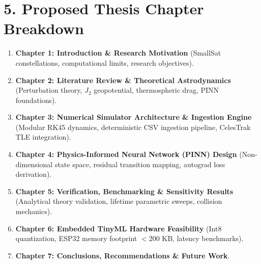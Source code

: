 \documentclass[11pt,a4paper]{article}
\begin{document}
\section*{5. Proposed Thesis Chapter Breakdown}
\begin{enumerate}[leftmargin=*,itemsep=1pt]
    \item \textbf{Chapter 1: Introduction \& Research Motivation} (SmallSat constellations, computational limits, research objectives).
    \item \textbf{Chapter 2: Literature Review \& Theoretical Astrodynamics} (Perturbation theory, $J_2$ geopotential, thermospheric drag, PINN foundations).
    \item \textbf{Chapter 3: Numerical Simulator Architecture \& Ingestion Engine} (Modular RK45 dynamics, deterministic CSV ingestion pipeline, CelesTrak TLE integration).
    \item \textbf{Chapter 4: Physics-Informed Neural Network (PINN) Design} (Non-dimensional state space, residual transition mapping, autograd loss derivation).
    \item \textbf{Chapter 5: Verification, Benchmarking \& Sensitivity Results} (Analytical theory validation, lifetime parametric sweeps, collision mechanics).
    \item \textbf{Chapter 6: Embedded TinyML Hardware Feasibility} (Int8 quantization, ESP32 memory footprint $<200\text{ KB}$, latency benchmarks).
    \item \textbf{Chapter 7: Conclusions, Recommendations \& Future Work}.
\end{enumerate}
\end{document}
